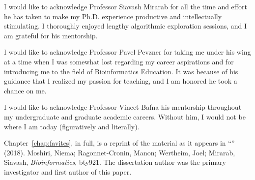 \begin{frontmatter}
\tableofcontents

\newpage
{}
\begin{center}\expandafter\MakeUppercase\expandafter{\abbrevtitle}\end{center}
\let\clearpage\relax
\vspace*{-2cm}
\printglossary[type=\acronymtype,title={}]

\listoffigures
\listoftables


\begin{acknowledgements}
I would like to acknowledge Professor Siavash Mirarab for all the time and effort he has taken to make my Ph.D. experience productive and intellectually stimulating. I thoroughly enjoyed lengthy algorithmic exploration sessions, and I am grateful for his mentorship.

I would like to acknowledge Professor Pavel Pevzner for taking me under his wing at a time when I was somewhat lost regarding my career aspirations and for introducing me to the field of Bioinformatics Education. It was because of his guidance that I realized my passion for teaching, and I am honored he took a chance on me.

I would like to acknowledge Professor Vineet Bafna his mentorship throughout my undergraduate and graduate academic careers. Without him, I would not be where I am today (figuratively and literally).

Chapter~\ref{chap:favites}, in full, is a reprint of the material as it appears in ``\favitestitle'' (2018). Moshiri, Niema; Ragonnet-Cronin, Manon; Wertheim, Joel; Mirarab, Siavash, \textit{Bioinformatics}, bty921. The dissertation author was the primary investigator and first author of this paper.
\end{acknowledgements}


\end{frontmatter}
